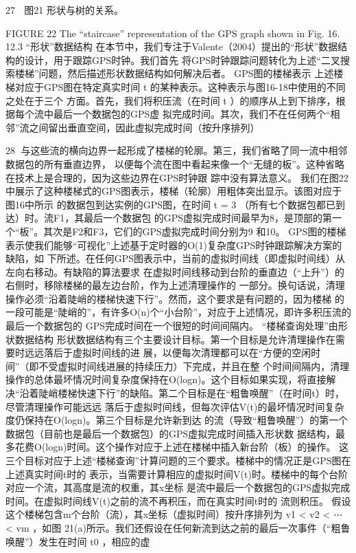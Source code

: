                                                                 27
                               图21 形状与树的关系。




     FIGURE 22 The “staircase” representation of the GPS graph shown in Fig. 16.
12.3 “形状”数据结构
在本节中，我们专注于Valente（2004）提出的“形状”数据结构的设计，用于跟踪GPS时钟。我们首先
将GPS时钟跟踪问题转化为上述“二叉搜索楼梯”问题，然后描述形状数据结构如何解决后者。
GPS图的楼梯表示
上述楼梯对应于GPS图在特定真实时间 t 的某种表示。这种表示与图16-18中使用的不同之处在于三个
方面。首先，我们将积压流（在时间 t ）的顺序从上到下排序，根据每个流中最后一个数据包的GPS虚
拟完成时间。其次，我们不在任何两个“相邻”流之间留出垂直空间，因此虚拟完成时间（按升序排列）

                                                                                   28
与这些流的横向边界一起形成了楼梯的轮廓。第三，我们省略了同一流中相邻数据包的所有垂直边界，
以便每个流在图中看起来像一个“无缝的板”。这种省略在技术上是合理的，因为这些边界在GPS时钟跟
踪中没有算法意义。
我们在图22中展示了这种楼梯式的GPS图表示，楼梯（轮廓）用粗体突出显示。该图对应于图16中所示
的数据包到达实例的GPS图，在时间 t = 3 （所有七个数据包都已到达）时。流F1，其最后一个数据包
的GPS虚拟完成时间最早为8，是顶部的第一个“板”。其次是F2和F3，它们的GPS虚拟完成时间分别为9
和10。
GPS图的楼梯表示使我们能够“可视化”上述基于定时器的O(1)复杂度GPS时钟跟踪解决方案的缺陷，如
下所述。在任何GPS图表示中，当前的虚拟时间线（即虚拟时间线）从左向右移动。有缺陷的算法要求
在虚拟时间线移动到台阶的垂直边（“上升”）的右侧时，移除楼梯的最左边台阶，作为上述清理操作的
一部分。换句话说，清理操作必须“沿着陡峭的楼梯快速下行”。然而，这个要求是有问题的，因为楼梯
的一段可能是“陡峭的”，有许多O(n)个“小台阶”，对应于上述情况，即许多积压流的最后一个数据包的
GPS完成时间在一个很短的时间间隔内。
“楼梯查询处理”由形状数据结构
形状数据结构有三个主要设计目标。第一个目标是允许清理操作在需要时远远落后于虚拟时间线的进
展，以便每次清理都可以在“方便的空闲时间”（即不受虚拟时间线进展的持续压力）下完成，并且在整
个时间间隔内，清理操作的总体最坏情况时间复杂度保持在O(logn)。这个目标如果实现，将直接解
决“沿着陡峭楼梯快速下行”的缺陷。第二个目标是在“粗鲁唤醒”（在时间t）时，尽管清理操作可能远远
落后于虚拟时间线，但每次评估V(t)的最坏情况时间复杂度仍保持在O(logn)。第三个目标是允许新到达
的流（导致“粗鲁唤醒”）的第一个数据包（目前也是最后一个数据包）的GPS虚拟完成时间插入形状数
据结构，最多花费O(logn)时间。这个操作对应于上述在楼梯中插入新台阶（板）的操作。
这三个目标对应于上述“楼梯查询”计算问题的三个要求。楼梯中的情况正是GPS图在上述真实时间t时的
表示，当需要计算相应的虚拟时间V(t)时。楼梯中的每个台阶对应一个流，其高度是流的权重，其x坐标
是流中最后一个数据包的GPS虚拟完成时间。在虚拟时间线V(t)之前的流不再积压，而在真实时间t时的
流则积压。
假设这个楼梯包含m个台阶（流），其x坐标（虚拟时间）按升序排列为 v1 < v2 < ⋯ < vm ，如图
21(a)所示。我们还假设在任何新流到达之前的最后一次事件（“粗鲁唤醒”）发生在时间 t0 ，相应的虚
                                                   ​   ​       ​




